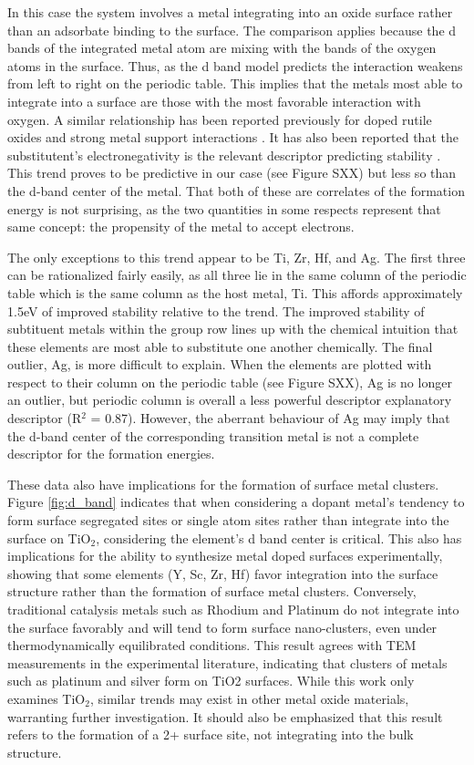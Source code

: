 In this case the system involves a metal integrating into an oxide surface rather than an adsorbate binding to the surface. The comparison applies because the d bands of the integrated metal atom are mixing with the bands of the oxygen atoms in the surface. Thus, as the d band model predicts the interaction weakens from left to right on the periodic table. This implies that the metals most able to integrate into a surface are those with the most favorable interaction with oxygen. A similar relationship has been reported previously for doped rutile oxides \cite{Xu_2015} and strong metal support interactions \cite{O_Connor_2018}. It has also been reported that the substitutent's electronegativity is the relevant descriptor predicting stability \cite{Garc_a_Mota_2011}. This trend proves to be predictive in our case (see Figure SXX) but less so than the d-band center of the metal. That both of these are correlates of the formation energy is not surprising, as the two quantities in some respects represent that same concept: the propensity of the metal to accept electrons.

The only exceptions to this trend appear to be Ti, Zr, Hf, and Ag. The first three can be rationalized fairly easily, as all three lie in the same column of the periodic table which is the same column as the host metal, Ti. This affords approximately 1.5eV of improved stability relative to the trend. The improved stability of subtituent metals within the group row lines up with the chemical intuition that these elements are most able to substitute one another chemically. The final outlier, Ag, is more difficult to explain. When the elements are plotted with respect to their column on the periodic table (see Figure SXX), Ag is no longer an outlier, but periodic column is overall a less powerful descriptor explanatory descriptor (R$^2$ = 0.87). However, the aberrant behaviour of Ag may imply that the d-band center of the corresponding transition metal is not a complete descriptor for the formation energies.

These data also have implications for the formation of surface metal clusters. Figure \ref{fig:d_band} indicates that when considering a dopant metal's tendency to form surface segregated sites or single atom sites rather than integrate into the surface on TiO$_2$, considering the element's d band center is critical. This also has implications for the ability to synthesize metal doped surfaces experimentally, showing that some elements (Y, Sc, Zr, Hf) favor integration into the surface structure rather than the formation of surface metal clusters. Conversely, traditional catalysis metals such as Rhodium and Platinum do not integrate into the surface favorably and will tend to form surface nano-clusters, even under thermodynamically equilibrated conditions. This result agrees with TEM measurements in the experimental literature, indicating that clusters of metals such as platinum and silver form on TiO2 surfaces.\cite{Iliev_2006}  While this work only examines TiO$_2$, similar trends may exist in other metal oxide materials, warranting further investigation. It should also be emphasized that this result refers to the formation of a 2+ surface site, not integrating into the bulk structure.

